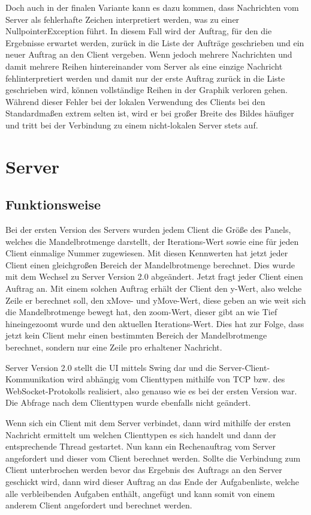 \documentclass[12pt, onecolumn, notitlepage]{scrartcl}
\begin{document}
Doch auch in der finalen Variante kann es dazu kommen, dass Nachrichten vom Server als fehlerhafte Zeichen interpretiert werden, was zu einer NullpointerException führt. In diesem Fall wird der Auftrag, für den die Ergebnisse erwartet werden, zurück in die Liste der Aufträge geschrieben und ein neuer Auftrag an den Client vergeben. Wenn jedoch mehrere Nachrichten und damit mehrere Reihen hintereinander vom Server als eine einzige Nachricht fehlinterpretiert werden und damit nur der erste Auftrag zurück in die Liste geschrieben wird, können vollständige Reihen in der Graphik verloren gehen. Während dieser Fehler bei der lokalen Verwendung des Clients bei den Standardmaßen extrem selten ist, wird er bei großer Breite des Bildes häufiger und tritt bei der Verbindung zu einem nicht-lokalen Server stets auf.


\section{Server}
\subsection{Funktionsweise}
Bei der ersten Version des Servers wurden jedem Client die Größe des Panels, welches die Mandelbrotmenge darstellt, der Iterations-Wert sowie eine für jeden Client einmalige Nummer zugewiesen. Mit diesen Kennwerten hat jetzt jeder Client einen gleichgroßen Bereich der Mandelbrotmenge berechnet. Dies wurde mit dem Wechsel zu Server Version 2.0 abgeändert. Jetzt fragt jeder Client einen Auftrag an. Mit einem solchen Auftrag erhält der Client den y-Wert, also welche Zeile er berechnet soll, den xMove- und yMove-Wert, diese geben an wie weit sich die Mandelbrotmenge bewegt hat, den zoom-Wert, dieser gibt an wie Tief hineingezoomt wurde und den aktuellen Iterations-Wert. Dies hat zur Folge, dass jetzt kein Client mehr einen bestimmten Bereich der Mandelbrotmenge berechnet, sondern nur eine Zeile pro erhaltener Nachricht. \par
Server Version 2.0 stellt die UI mittels Swing dar und die Server-Client-Kommunikation wird abhängig vom Clienttypen mithilfe von TCP bzw. des WebSocket-Protokolls realisiert, also genauso wie es bei der ersten Version war. Die Abfrage nach dem Clienttypen wurde ebenfalls nicht geändert. \par
Wenn sich ein Client mit dem Server verbindet, dann wird mithilfe der ersten Nachricht ermittelt um welchen Clienttypen es sich handelt und dann der entsprechende Thread gestartet. Nun kann ein Rechenauftrag vom Server angefordert und dieser vom Client berechnet werden. Sollte die Verbindung zum Client unterbrochen werden bevor das Ergebnis des Auftrags an den Server geschickt wird, dann wird dieser Auftrag an das Ende der Aufgabenliste, welche alle verbleibenden Aufgaben enthält, angefügt und kann somit von einem anderem Client angefordert und berechnet werden.
\end{document}
